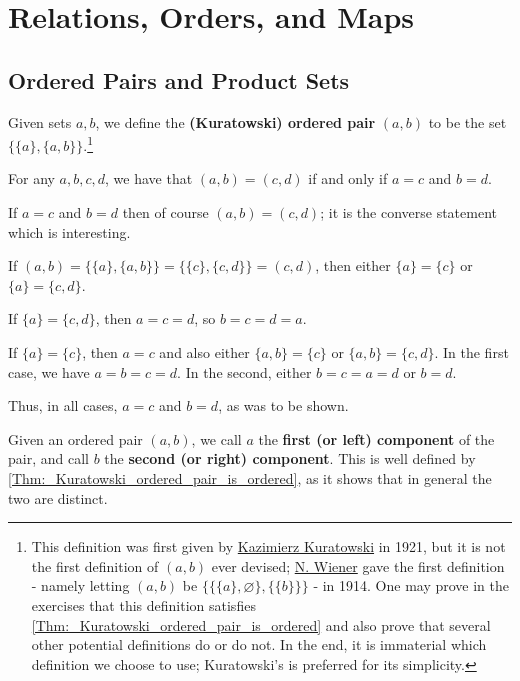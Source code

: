 \chapter{Relations, Orders, and Maps}
\label{Chpt:_Relations_Orders_and_Maps}

\section{Ordered Pairs and Product Sets}
\label{--Sec:_Ordered_Pairs_and_Product_Sets}

\begin{defn}
\label{Defn:_Kuratowski_Ordered_Pair}
Given sets $a, b$, we define the \textbf{(Kuratowski) ordered pair} $(a, b)$ to be the set $\{\{a\}, \{a, b\}\}$.\footnote{This definition was first given by \hyperref[KKuratowski]{Kazimierz Kuratowski} in 1921, but it is not the first definition of $(a, b)$ ever devised; \hyperref[NWiener]{N. Wiener} gave the first definition - namely letting $(a, b)$ be $\{\{\{a\}, \varnothing\}, \{\{b\}\}\}$ - in 1914. One may prove in the exercises that this definition satisfies \autoref{Thm:_Kuratowski_ordered_pair_is_ordered} and also prove that several other potential definitions do or do not. In the end, it is immaterial which definition we choose to use; Kuratowski's is preferred for its simplicity.}
\end{defn}

\begin{thm}
\label{Thm:_Kuratowski_ordered_pair_is_ordered}
For any $a, b, c, d$, we have that $(a, b) = (c, d)$ if and only if $a=c$ and $b=d$.
\end{thm}

\begin{prf}
If $a = c$ and $b=d$ then of course $(a, b)=(c, d)$; it is the converse statement which is interesting.

If $(a, b) = \{\{a\}, \{a, b\}\} = \{\{c\}, \{c, d\}\} = (c, d)$, then either $\{a\} = \{c\}$ or $\{a\}=\{c, d\}$.

If $\{a\} = \{c, d\}$, then $a=c=d$, so $b=c=d=a$.

If $\{a\} = \{c\}$, then $a=c$ and also either $\{a, b\}=\{c\}$ or $\{a, b\}=\{c, d\}$. In the first case, we have $a=b=c=d$. In the second, either $b=c=a=d$ or $b=d$.

Thus, in all cases, $a=c$ and $b=d$, as was to be shown.
\end{prf}

\begin{defn}
\label{Defn:_Components_of_ordered_pairs}
Given an ordered pair $(a,b)$, we call $a$ the \textbf{first (or left) component} of the pair, and call $b$ the \textbf{second (or right) component}. This is well defined by \autoref{Thm:_Kuratowski_ordered_pair_is_ordered}, as it shows that in general the two are distinct.
\end{defn}

